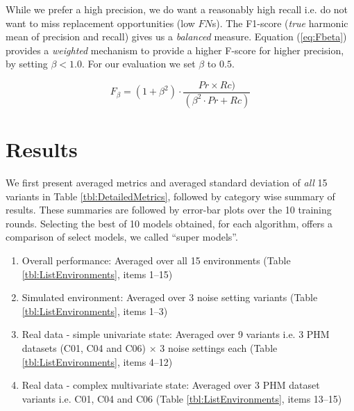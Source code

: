 \documentclass[a4paper, 12pt]{article}
\begin{document}
While we prefer a high precision, we do want a reasonably high recall i.e. do not want to miss replacement opportunities (low $FN$s). The F1-score (\textit{true} harmonic mean of precision and recall) gives us a \textit{balanced} measure. Equation (\ref{eq:Fbeta}) provides a \textit{weighted} mechanism to provide a higher F-score for higher precision, by setting $\beta < 1.0$. For our evaluation we set $\beta$ to $0.5$.

\begin{equation}
	F_{\beta} = (1+\beta^2) \cdot \frac{Pr \times Rc)}{(\beta^2 \cdot Pr + Rc)}
	\label{eq:Fbeta}
\end{equation}

%	

\section{Results}\label{sec:Results}
We first present averaged metrics and averaged standard deviation of \textit{all} 15 variants in Table \ref{tbl:DetailedMetrics}, followed by category wise summary of results. These summaries are followed by error-bar plots over the 10 training rounds. Selecting the best of 10 models obtained, for each algorithm, offers a comparison of select models, we called ``super models''. 

\begin{enumerate}
	\item Overall performance: Averaged over all 15 environments (Table \ref{tbl:ListEnvironments}, items 1--15)
	\item Simulated environment: Averaged over 3 noise setting variants (Table \ref{tbl:ListEnvironments}, items 1--3)
	\item Real data - simple univariate state: Averaged over 9 variants i.e. 3 PHM datasets (C01, C04 and C06) $\times$ 3 noise settings each (Table \ref{tbl:ListEnvironments}, items 4--12) 
	\item Real data - complex multivariate state: Averaged over 3 PHM dataset variants i.e. C01, C04 and C06 (Table \ref{tbl:ListEnvironments}, items 13--15)
\end{enumerate}
\end{document}

